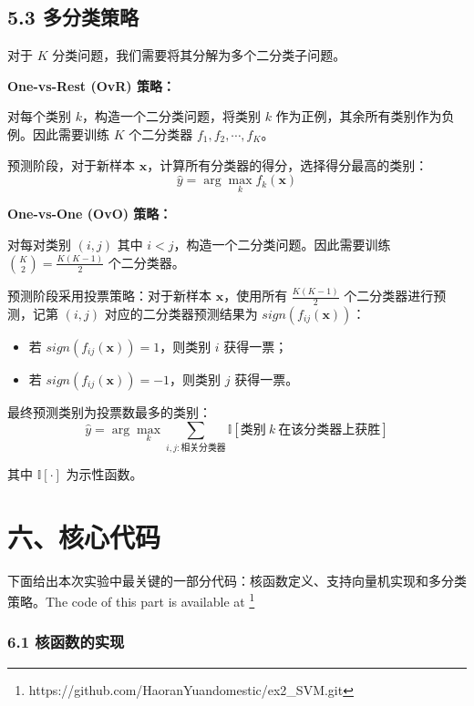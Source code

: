 \documentclass[12pt,a4paper]{ctexart}
\begin{document}
	\subsection*{5.3 多分类策略}
	
	对于 $K$ 分类问题，我们需要将其分解为多个二分类子问题。
	
	\textbf{One-vs-Rest (OvR) 策略：}
	
	对每个类别 $k$，构造一个二分类问题，将类别 $k$ 作为正例，其余所有类别作为负例。因此需要训练 $K$ 个二分类器 $f_1,f_2,\cdots,f_K$。
	
	预测阶段，对于新样本 $\bm{x}$，计算所有分类器的得分，选择得分最高的类别：
	\[
	\hat{y}=\arg\max_{k} f_k(\bm{x})
	\]
	
	\textbf{One-vs-One (OvO) 策略：}
	
	对每对类别 $(i,j)$ 其中 $i < j$，构造一个二分类问题。因此需要训练 $\binom{K}{2}=\frac{K(K-1)}{2}$ 个二分类器。
	
	预测阶段采用投票策略：对于新样本 $\bm{x}$，使用所有 $\frac{K(K-1)}{2}$ 个二分类器进行预测，记第 $(i,j)$ 对应的二分类器预测结果为 $sign(f_{ij}(\bm{x}))$：
	\begin{itemize}
		\item[(1)] 若 $sign(f_{ij}(\bm{x}))=1$，则类别 $i$ 获得一票；
		\item[(2)] 若 $sign(f_{ij}(\bm{x}))=-1$，则类别 $j$ 获得一票。
	\end{itemize}
	
	最终预测类别为投票数最多的类别：
	\[
	\hat{y}=\arg\max_{k} \sum_{i,j: \text{相关分类器}} \mathbb{I}[\text{类别}~k~\text{在该分类器上获胜}]
	\]
	
	其中 $\mathbb{I}[\cdot]$ 为示性函数。
	
	\section*{六、核心代码}
	下面给出本次实验中最关键的一部分代码：核函数定义、支持向量机实现和多分类策略。The code of this part is available at \footnote{https://github.com/HaoranYuandomestic/ex2\_SVM.git}
	
	\subsubsection*{6.1 核函数的实现}
	
\end{document}
